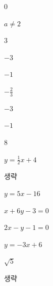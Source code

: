 \documentclass{oblivoir}
\begin{document}
\begin{minipage}[t]{.49\textwidth}
%
\(0\)

%
\(a\neq2\)

%
\(3\)

%
\(-3\)

%
\(-1\)

%
\(-\frac23\)

%
\(-3\)

%
\(-1\)

%
\(8\)

\end{minipage}
\begin{minipage}[t]{.49\textwidth}

%
\(y=\frac12x+4\)

%
생략

%
\(y=5x-16\)

%
\(x+6y-3=0\)

%
\(2x-y-1=0\)

%
\(y=-3x+6\)

%
\(\sqrt5\)

%
생략
\end{minipage}

\end{document}
